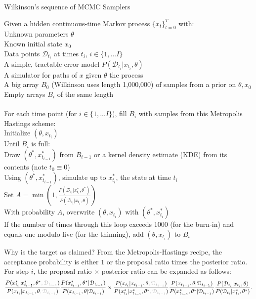 \documentclass{article}
\begin{document}
\begin{algorithm}[h]
\caption{ \label{pMCMC} Wilkinson's sequence of MCMC Samplers}
Given a hidden continuous-time Markov process $\{x_t\}_{t=0}^T$ with: \\
\Indp \Indp
Unknown parameters $\theta$\\
Known initial state $x_0$\\
Data points $\mathcal{D}_{t_{i}}$ at times $t_{i}$, $i \in \{1, ... I\}$ \\
A simple, tractable error model $P(\mathcal{D}_{t_{i}}|x_{t_{i}}, \theta)$\\
A simulator for paths of $x$ given $\theta$ the process\\
A big array $B_0$ (Wilkinson uses length 1,000,000) of samples from a prior on $\theta, x_0$\\
Empty arrays $B_{i}$ of the same length\\
$\phantom{0}$\\
\Indm \Indm
For each time point (for $i \in \{1, ... I\}$), fill $B_{i}$ with samples from this Metropolis Hastings scheme:\\
\Indp\Indp
Initialize $(\theta, x_{t_{i}})$ \\
Until $B_{i}$ is full: \\
\Indp\Indp
Draw $(\theta^*, x_{t_{i-1}}^*)$ from $B_{i-1}$ or a kernel density estimate (KDE) from its contents (note $t_0\equiv0$)\\
Using $(\theta^*, x_{t_{i-1}}^*)$, simulate up to $x_{t_{i}}^*$, the state at time $t_{i}$ \\
Set $A=\min(1, \frac{P(\mathcal{D}_{t_{i}}|x_{t_{i}}^*, \theta^*)}{P(\mathcal{D}_{t_{i}}|x_{t_{i}}, \theta)})$\\
With probability $A$, overwrite $(\theta, x_{t_{i}})$ with $(\theta^*, x_{t_{i}}^*)$\\
If the number of times through this loop exceeds 1000 (for the burn-in) and equals one modulo five (for the thinning), add $(\theta, x_{t_{i}})$ to $B_{i}$\\
\Indm \Indm
\end{algorithm}
\pagebreak
Why is the target as claimed? From the Metropolis-Hastings recipe, the acceptance probability is either $1$ or the proposal ratio times the posterior ratio. For step $i$, the proposal ratio $\times$ posterior ratio can be expanded as follows:
$$ \frac{P(x_{t_{i}}^*| x_{t_{i-1}}^*,\theta^*\gray{, \mathcal{D}_{t_{i-1}}})}{P(x_{t_{i}}| x_{t_{i-1}}, \theta \gray{, \mathcal{D}_{t_{i-1}}})} 
\frac{P(x_{t_{i-1}}^*,\theta^*| \mathcal{D}_{t_{i-1}})}{P(x_{t_{i-1}}, \theta| \mathcal{D}_{t_{i-1}})}
\times 
\frac{P(x_{t_{i}}| x_{t_{i-1}}, \theta \gray{, \mathcal{D}_{t_{i-1}}})}{P(x_{t_{i}}^*| x_{t_{i-1}}^*,\theta^*\gray{, \mathcal{D}_{t_{i-1}}})}
\frac{ P(x_{t_{i-1}}, \theta| \mathcal{D}_{t_{i-1}})}{ P( x_{t_{i-1}}^*,\theta^*| \mathcal{D}_{t_{i-1}})}   
\frac{P(\mathcal{D}_{t_{i}}|x_{t_{i}}, \theta)}{P(\mathcal{D}_{t_{i}}|x_{t_{i}}^*, \theta^*)}.$$   
\end{document}
